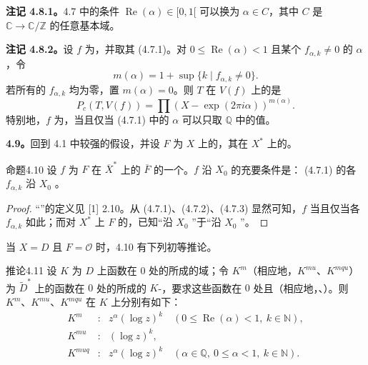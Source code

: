 \textbf{注记 4.8.1。}4.7 中的条件 $\operatorname{Re}(\alpha)\in[0,1[$ 可以换为 $\alpha\in C$，其中 $C$ 是 $\mathbb C\to\mathbb C/\mathbb Z$ 的任意基本域。

\textbf{注记 4.8.2。}设 $f$ 为，并取其 (4.7.1)。对 $0\leq\operatorname{Re}(\alpha)<1$ 且某个 $f_{\alpha,k}\neq0$ 的 $\alpha$，令
\[
 m(\alpha)=1+\sup\{k\mid f_{\alpha,k}\neq0\}.
\]
若所有的 $f_{\alpha,k}$ 均为零，置 $m(\alpha)=0$。则 $T$ 在 $V(f)$ 上的是
\[
 P_c(T,V(f))=\prod(X-\exp(2\pi i\alpha))^{m(\alpha)}.
\]
特别地，$f$ 为，当且仅当 (4.7.1) 中的 $\alpha$ 可以只取 $\mathbb Q$ 中的值。

\textbf{4.9。}回到 4.1 中较强的假设，并设 $F$ 为 $X$ 上的，其在 $X^*$ 上的。

\begin{SGAresult}{命题}{4.10}
设 $f$ 为 $F$ 在 $\overline X^*$ 上的 $\overline F$ 的一个。$f$ 沿 $X_0$ 的充要条件是： (4.7.1) 的各 $f_{\alpha,k}$ 沿 $X_0$ 。
\end{SGAresult}
\begin{proof}
“”的定义见 [1] 2.10。从 (4.7.1)、(4.7.2)、(4.7.3) 显然可知，$f$ 当且仅当各 $f_{\alpha,k}$ 如此；而对 $X^*$ 上 $F$ 的，已知“沿 $X_0$ ”于“沿 $X_0$ ”。
\end{proof}
当 $X=D$ 且 $F=\mathscr O$ 时，4.10 有下列初等推论。

\begin{SGAresult}{推论}{4.11}
设 $K$ 为 $D$ 上函数在 $0$ 处的所成的域；令 $K^m$（相应地，$K^{mu}$、$K^{mqu}$）为 $\widetilde D^*$ 上的函数在 $0$ 处的所成的 $K$-，要求这些函数在 $0$ 处且（相应地，、）。则 $K^m$、$K^{mu}$、$K^{mqu}$ 在 $K$ 上分别有如下：
\[
\begin{array}{ccl}
 K^m&:&z^\alpha(\log z)^k\quad(0\leq\operatorname{Re}(\alpha)<1,\ k\in\mathbb N),\\
 K^{mu}&:&(\log z)^k,\\
 K^{muq}&:&z^\alpha(\log z)^k\quad(\alpha\in\mathbb Q,\ 0\leq\alpha<1,\ k\in\mathbb N).
\end{array}
\]
\end{SGAresult}

